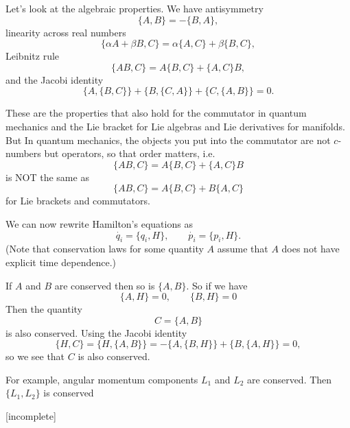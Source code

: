 \documentclass[12pt]{article} %
\begin{document}
Let's look at the algebraic properties. We have antisymmetry
\begin{equation}
\{A, B\} = - \{B, A\},
\end{equation}
linearity across real numbers
\begin{equation}
\{\alpha A + \beta B, C\} = \alpha\{ A, C\} + \beta\{B, C\},
\end{equation}
Leibnitz rule
\begin{equation}
\{AB, C\} = A\{B, C\} + \{ A, C\} B,
\end{equation}
and the Jacobi identity
\begin{equation}
\{A, \{B, C\}\} + \{B, \{C, A\}\} + \{C, \{A, B\}\} = 0.
\end{equation}

These are the properties that also hold for the commutator in quantum mechanics and the Lie bracket for Lie algebras and Lie derivatives for manifolds. But In quantum mechanics, the objects you put into the commutator are not $c$-numbers but operators, so that order matters, i.e.
\begin{equation}
\{AB, C\} = A\{B, C\}+ \{A, C\} B
\end{equation}
is NOT the same as
\begin{equation}
\{AB, C\} = A\{B, C\}+ B\{A, C\} 
\end{equation}
for Lie brackets and commutators. 

We can now rewrite Hamilton's equations as
\begin{equation}
\dot{q_i} = \{q_i, H\}, \qquad 
\dot{p_i} = \{ p_i, H\}.
\end{equation}
(Note that conservation laws for some quantity $A$ assume that $A$ does not have explicit time dependence.)

If $A$ and $B$ are conserved then so is $\{A, B\}$. So if we have
\begin{equation}
\{A, H\} = 0, \qquad 
\{B, H\} = 0
\end{equation}
Then the quantity
\begin{equation}
C = \{A, B\}
\end{equation}
is also conserved. Using the Jacobi identity
\begin{equation}
\{H, C\} = \{H, \{A, B\}\} = -\{A, \{B, H\}\} + \{B, \{A, H\}\} = 0,
\end{equation}
so we see that $C$ is also conserved.

For example, angular momentum components $L_1$ and $L_2$ are conserved. Then $\{L_1, L_2\}$ is conserved

[incomplete]
\end{document}
